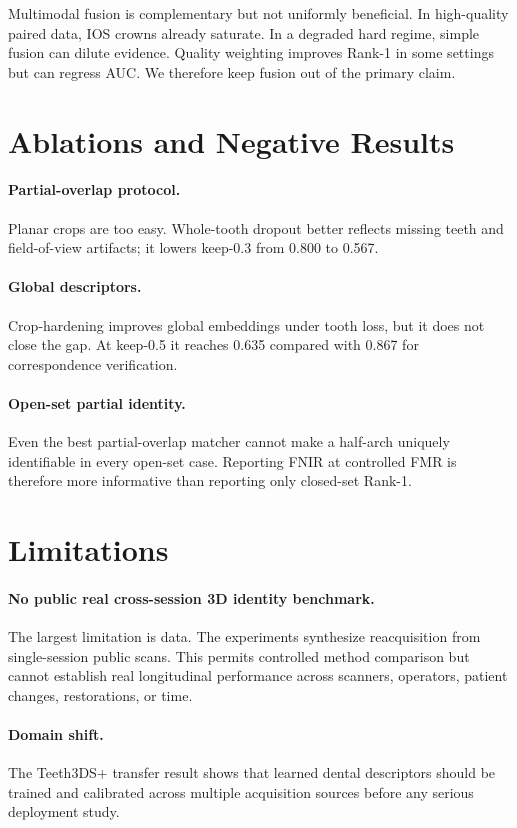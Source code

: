 \documentclass[10pt,twocolumn]{article}
\begin{document}
Multimodal fusion is complementary but not uniformly beneficial. In high-quality paired data, IOS crowns already saturate. In a degraded hard regime, simple fusion can dilute evidence. Quality weighting improves Rank-1 in some settings but can regress AUC. We therefore keep fusion out of the primary claim.

\section{Ablations and Negative Results}
\paragraph{Partial-overlap protocol.}
Planar crops are too easy. Whole-tooth dropout better reflects missing teeth and field-of-view artifacts; it lowers keep-0.3 from 0.800 to 0.567.

\paragraph{Global descriptors.}
Crop-hardening improves global embeddings under tooth loss, but it does not close the gap. At keep-0.5 it reaches 0.635 compared with 0.867 for correspondence verification.

\paragraph{Open-set partial identity.}
Even the best partial-overlap matcher cannot make a half-arch uniquely identifiable in every open-set case. Reporting FNIR at controlled FMR is therefore more informative than reporting only closed-set Rank-1.

\section{Limitations}
\paragraph{No public real cross-session 3D identity benchmark.}
The largest limitation is data. The experiments synthesize reacquisition from single-session public scans. This permits controlled method comparison but cannot establish real longitudinal performance across scanners, operators, patient changes, restorations, or time.

\paragraph{Domain shift.}
The Teeth3DS+ transfer result shows that learned dental descriptors should be trained and calibrated across multiple acquisition sources before any serious deployment study.
\end{document}
